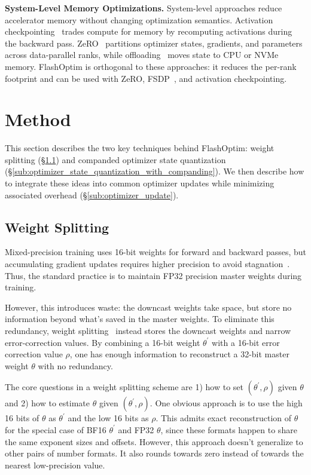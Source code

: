\documentclass[10pt,twocolumn,letterpaper]{article}
\theoremstyle{plain}
\theoremstyle{definition}
\theoremstyle{remark}
\newcommand{\flashOptim}{FlashOptim\xspace}
\newcommand{\thetalp}{\theta^\prime}
\begin{document}
\textbf{System-Level Memory Optimizations.}
System-level approaches reduce accelerator memory without changing optimization semantics.
Activation checkpointing~\citep{chen2016training,korthikanti2023reducing} trades compute for memory by recomputing activations during the backward pass.
ZeRO~\citep{rajbhandari2020zero} partitions optimizer states, gradients, and parameters across data-parallel ranks, while offloading~\citep{rajbhandari2021zeroinfinity,ren2021zero} moves state to CPU or NVMe memory.
\flashOptim is orthogonal to these approaches: it reduces the per-rank footprint and can be used with ZeRO, FSDP~\citep{zhao2023pytorchfsdp}, and activation checkpointing.



\section{Method} \label{sec:method}

This section describes the two key techniques behind \flashOptim: weight splitting (\S\ref{sub:ulp_weight_compression}) and companded optimizer state quantization (\S\ref{sub:optimizer_state_quantization_with_companding}).
We then describe how to integrate these ideas into common optimizer updates while minimizing associated overhead (\S\ref{sub:optimizer_update}).



\subsection{Weight Splitting}
\label{sub:ulp_weight_compression}

Mixed-precision training uses 16-bit weights for forward and backward passes, but accumulating gradient updates requires higher precision to avoid stagnation~\citep{micikevicius2018mixed}.
Thus, the standard practice is to maintain FP32 precision master weights during training.

However, this introduces waste: the downcast weights take space, but store no information beyond what's saved in the master weights. To eliminate this redundancy, weight splitting~\citep{zamirai2020revisiting,warner2024optimi} instead stores the downcast weights and narrow error-correction values. By combining a 16-bit weight $\thetalp$ with a 16-bit error correction value $\rho$, one has enough information to reconstruct a 32-bit master weight $\theta$ with no redundancy. 


The core questions in a weight splitting scheme are 1) how to set $(\thetalp, \rho)$ given $\theta$ and 2) how to estimate $\theta$ given $(\thetalp, \rho)$.  
One obvious approach is to use the high 16 bits of $\theta$ as $\thetalp$ and the low 16 bits as $\rho$. This admits exact reconstruction of $\theta$ for the special case of BF16 $\thetalp$ and FP32 $\theta$, since these formats happen to share the same exponent sizes and offsets. However, this approach doesn't generalize to other pairs of number formats. It also rounds towards zero instead of towards the nearest low-precision value. 
\end{document}
